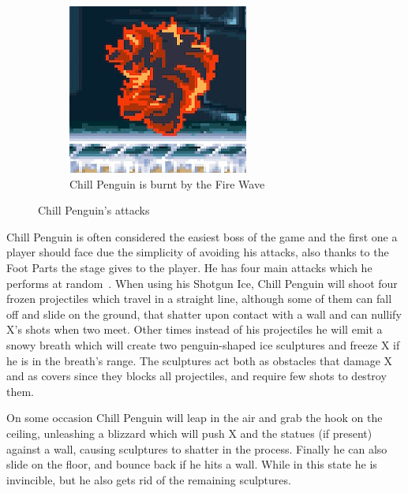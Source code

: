 \begin{figure}[htp]
\begin{subfigure}[t]{0.35\textwidth}
		\includegraphics[width=\linewidth]{figures/X1/Chill_penguin/Chill_burn.jpg}
		\caption{Chill Penguin is burnt by the Fire Wave}
	\end{subfigure}
	\caption{Chill Penguin's attacks}
\end{figure}

Chill Penguin is often considered the easiest boss of the game and the first one a player should face due the simplicity of avoiding his attacks, also thanks to the Foot Parts the stage gives to the player. He has four main attacks which he performs at random~\cite{wiki:Chill_Penguin}. When using his Shotgun Ice, Chill Penguin will shoot four frozen projectiles which travel in a straight line, although some of them  can fall off and slide on the ground, that shatter upon contact with a wall and can nullify X's shots when two meet. Other times instead of his projectiles he will emit a snowy breath which will create two penguin-shaped ice sculptures and freeze X if he is in the breath's range. The sculptures act both as obstacles that damage X and as covers since they blocks all projectiles, and require few shots to destroy them. 

On some occasion Chill Penguin will leap in the air and grab the hook on the ceiling, unleashing a blizzard which will push X and the statues (if present) against a wall, causing sculptures to shatter in the process. Finally he can also slide on the floor, and bounce back if he hits a wall. While in this state he is invincible, but he also gets rid of the remaining sculptures.  

